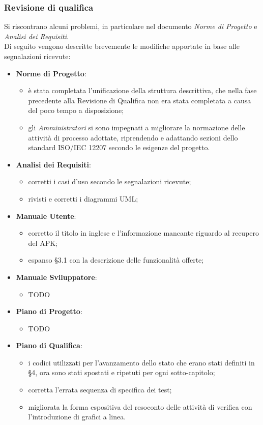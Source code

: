 	\subsubsection{Revisione di qualifica}
	Si riscontrano alcuni problemi, in particolare nel documento \textit{Norme di Progetto} e \textit{Analisi dei Requisiti}.\\
	Di seguito vengono descritte brevemente le modifiche apportate in base alle segnalazioni ricevute:
	\begin{itemize}
		\item \textbf{Norme di Progetto}: 
			\begin{itemize}
				\item è stata completata l'unificazione della struttura descrittiva, che nella fase precedente alla Revisione di Qualifica non era stata completata a causa del poco tempo a disposizione;
				\item gli \textit{Amministratori} si sono impegnati a migliorare la normazione delle attività di processo adottate, riprendendo e adattando sezioni dello standard ISO/IEC 12207 secondo le esigenze del progetto.  
			\end{itemize}
		\item \textbf{Analisi dei Requisiti}:
			\begin{itemize}
				\item corretti i casi d'uso secondo le segnalazioni ricevute;
				\item rivisti e corretti i diagrammi UML;
			\end{itemize}
		\item \textbf{Manuale Utente}:
			\begin{itemize}
				\item corretto il titolo in inglese e l'informazione mancante riguardo al recupero del 
				APK;
				\item espanso §3.1 con la descrizione delle funzionalità offerte;
			\end{itemize}
		\item \textbf{Manuale Sviluppatore}:
			\begin{itemize}
				\item TODO
			\end{itemize}
		\item \textbf{Piano di Progetto}:
			\begin{itemize}
				\item TODO
			\end{itemize}
		\item \textbf{Piano di Qualifica}:
			\begin{itemize}
				\item i codici utilizzati per l'avanzamento dello stato che erano stati definiti in §4, ora sono stati spostati e ripetuti per ogni sotto-capitolo;
				\item corretta l'errata sequenza di specifica dei test;
				\item migliorata la forma espositiva del resoconto delle attività di verifica con l'introduzione di grafici a linea.
			\end{itemize}
	\end{itemize}
	\newpage
